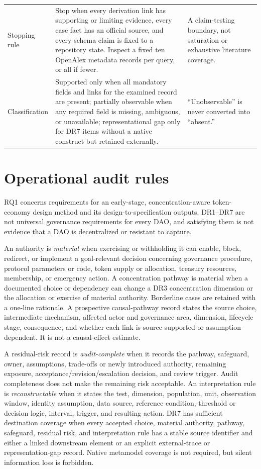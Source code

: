 \documentclass[10pt]{article}
\begin{document}
\begin{table}[h]
\begin{tabularx}{\linewidth}{@{}p{.18\linewidth}YY@{}}
Stopping rule & Stop when every derivation link has supporting or limiting evidence, every case fact has an official source, and every schema claim is fixed to a repository state. Inspect a fixed ten OpenAlex metadata records per query, or all if fewer. & A claim-testing boundary, not saturation or exhaustive literature coverage. \\
Classification & Supported only when all mandatory fields and links for the examined record are present; partially observable when any required field is missing, ambiguous, or unavailable; representational gap only for DR7 items without a native construct but retained externally. & ``Unobservable'' is never converted into ``absent.'' \\
\bottomrule
\end{tabularx}
\end{table}

\clearpage
\section*{Operational audit rules}

RQ1 concerns requirements for an early-stage, concentration-aware token-economy
design method and its design-to-specification outputs. DR1--DR7 are not universal
governance requirements for every DAO, and satisfying them is not evidence that
a DAO is decentralized or resistant to capture.

An authority is \emph{material} when exercising or withholding it can enable,
block, redirect, or implement a goal-relevant decision concerning governance
procedure, protocol parameters or code, token supply or allocation, treasury
resources, membership, or emergency action. A concentration pathway is material
when a documented choice or dependency can change a DR3 concentration dimension
or the allocation or exercise of material authority. Borderline cases are
retained with a one-line rationale. A prospective causal-pathway record states
the source choice, intermediate mechanism, affected actor and governance area,
dimension, lifecycle stage, consequence, and whether each link is source-supported
or assumption-dependent. It is not a causal-effect estimate.

A residual-risk record is \emph{audit-complete} when it records the pathway,
safeguard, owner, assumptions, trade-offs or newly introduced authority,
remaining exposure, acceptance/revision/escalation decision, and review trigger.
Audit completeness does not make the remaining risk acceptable. An interpretation
rule is \emph{reconstructable} when it states the test, dimension, population,
unit, observation window, identity assumption, data source, reference condition,
threshold or decision logic, interval, trigger, and resulting action. DR7 has
sufficient destination coverage when every accepted choice, material authority,
pathway, safeguard, residual risk, and interpretation rule has a stable source
identifier and either a linked downstream element or an explicit external-trace
or representation-gap record. Native metamodel coverage is not required, but
silent information loss is forbidden.
\end{document}
